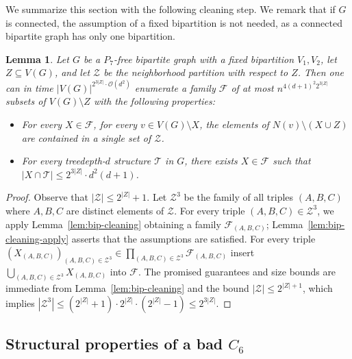 \documentclass[11pt,a4paper]{article}
\newtheorem{lemma}[theorem]{Lemma}
\theoremstyle{definition}
\newcommand{\Oh}{\mathcal{O}}
\def\T{\mathcal{T}}
\begin{document}
We summarize this section with the following cleaning step. We remark that if $G$ is connected, 
the assumption of a fixed bipartition is not needed, as a connected bipartite graph has only one bipartition.
\begin{lemma}\label{lem:bip-cleaning-full}
    Let $G$ be a $P_7$-free bipartite graph with a fixed bipartition $V_1,V_2$, let $Z \subseteq V(G)$,
    and let $\mathcal{Z}$ be the neighborhood partition  with respect to $Z$.
    Then one can in time $|V(G)|^{2^{3|Z|} \cdot \Oh(d^2)}$ enumerate a family $\mathcal{F}$ of at most $n^{4(d+1)^2 2^{3|Z|}}$ subsets
    of $V(G) \setminus Z$ with the following properties:
    \begin{itemize}
    \item For every $X \in \mathcal{F}$, for every $v \in V(G) \setminus X$, the elements of $N(v) \setminus (X \cup Z)$
    are contained in a single set of $\mathcal{Z}$.
    \item For every treedepth-$d$ structure $\T$ in $G$, there exists $X \in \mathcal{F}$
    such that $|X \cap \T| \leq 2^{3|Z|} \cdot d^2(d+1)$.
    \end{itemize}
\end{lemma}
\begin{proof}
    Observe that $|\mathcal{Z}| \leq 2^{|Z|} + 1$. 
    Let $\mathcal{Z}^3$ be the family of all triples $(A,B,C)$ where $A,B,C$ are distinct elements of $\mathcal{Z}$.
    For every triple $(A,B,C) \in \mathcal{Z}^3$, we apply Lemma~\ref{lem:bip-cleaning} 
    obtaining a family $\mathcal{F}_{(A,B,C)}$;
    Lemma~\ref{lem:bip-cleaning-apply} asserts that the assumptions are satisfied. 
    For every triple $(X_{(A,B,C)})_{(A,B,C) \in \mathcal{Z}^3}$\linebreak$ \in \prod_{(A,B,C) \in \mathcal{Z}^3} \mathcal{F}_{(A,B,C)}$
    insert $\bigcup_{(A,B,C) \in \mathcal{Z}^3} X_{(A,B,C)}$ into $\mathcal{F}$.
    The promised guarantees and size bounds are immediate from Lemma~\ref{lem:bip-cleaning} and the bound
    $|\mathcal{Z}| \leq 2^{|Z|+1}$, which implies $|\mathcal{Z}^3| \leq (2^{|Z|}+1) \cdot 2^{|Z|} \cdot (2^{|Z|}-1) \leq 2^{3|Z|}$. 
\end{proof}


\subsection{Structural properties of a bad $C_6$}\label{ss:bip-bad-C6}
\newcommand{\mainrest}{\mathsf{MR}}
\newcommand{\level}{\mathsf{depth}}
\newcommand{\RichClasses}{\mathsf{Cls}}
\end{document}
